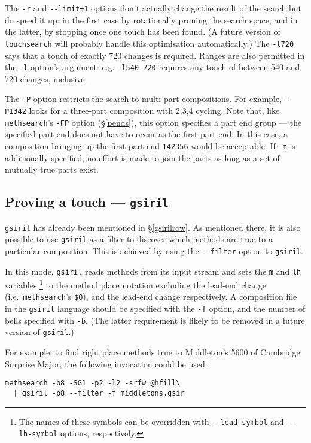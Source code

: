 \documentclass[a4paper,11pt,oneside]{book}
\makeatletter
\newcommand{\ttcmdidx}[1]{\texttt{#1}\index{#1@{\texttt{#1}}}}
\def\methsearch{\texttt{meth\-search}}
\newcommand{\sref}[1]{\hyperref[#1]{\S\ref{#1}}}
\makeatother
\begin{document}
The \verb+-r+ and \verb+--limit=1+ options don't actually change the 
result of the search but do speed it up: in the first case by rotationally
pruning the search space, and in the latter, by stopping once one touch 
has been found.  (A future version of \texttt{touchsearch} will probably
handle this optimisation automatically.)
The \verb+-l720+ says that a touch of exactly 720 changes is required.  
Ranges are also permitted in the \verb+-l+ option's argument: e.g.
\verb+-l540-720+ requires any touch of between 540 and 720 changes, inclusive.

The \verb+-P+ option restricts the search to multi-part compositions.  For 
example, \verb+-P1342+ looks for a three-part composition with 2,3,4 cycling.
Note that, like \methsearch's \verb+-FP+ option (\sref{pends}), this option
specifies a part end group 
— the specified part end does not have to occur as the first part end.
In this case, a composition bringing up 
the first part end \verb+142356+ would be acceptable.
If \verb+-m+ is 
additionally specified, no effort is made to join the parts as long
as a set of mutually true parts exist.

\subsection{Proving a touch — \texttt{gsiril}}\label{gsirilmeth}

\ttcmdidx{gsiril} has already been mentioned in \sref{gsirilrow}.  As
mentioned there, it is also possible to use \texttt{gsiril} as a filter
to discover which methods are true to a particular composition.   This
is achieved by using the \verb+--filter+ option to \texttt{gsiril}.

In this mode, \texttt{gsiril} reads methods from its input stream
and sets the \verb+m+ and \verb+lh+ variables%
\footnote{The names of these symbols can be overridden with             
\verb+--lead-symbol+ and \verb+--lh-symbol+ options, respectively.}
to the method place notation excluding the lead-end change 
(i.e.\ \methsearch's \verb+$Q+),  and the lead-end change respectively.
A composition file in the \texttt{gsiril} language should be specified with 
the \verb+-f+ option, and the number of bells specified with \verb+-b+.  
(The latter requirement is likely to be removed in a future version of 
\texttt{gsiril}.)

For example, to find right place methods true to Middleton's 5600 of 
Cambridge Surprise Major,
the following invocation could be used:%
\begin{Verbatim}[commandchars=@~~]
methsearch -b8 -SG1 -p2 -l2 -srfw @hfill\
  | gsiril -b8 --filter -f middletons.gsir
\end{Verbatim}
\end{document}
